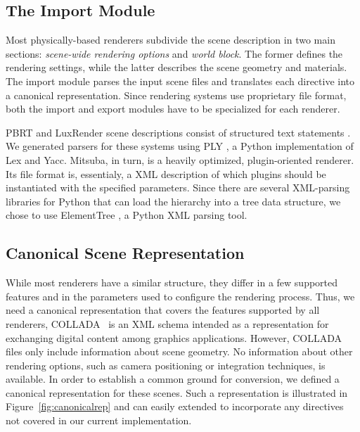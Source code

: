 \subsection{The Import Module}
Most physically-based renderers subdivide the scene description in two main sections:
{\it scene-wide rendering options} and {\it world block}. The former defines the rendering settings, while the latter describes the scene geometry and materials.
%
The import module parses the input scene files and translates each directive into a canonical
representation. Since rendering systems use proprietary file format, both the import and export modules have to be specialized for each renderer.

PBRT and LuxRender scene descriptions consist of structured text statements . We generated parsers for these systems using 
PLY \cite{ply}, a Python implementation of Lex and Yacc.
%
Mitsuba, in turn, is a heavily optimized, plugin-oriented renderer. Its file
format is, essentialy, a XML description of which plugins should be instantiated
with the specified parameters. Since there are several XML-parsing libraries for Python that can load the hierarchy into a tree data
structure, we chose to use ElementTree \cite{ET}, a Python XML parsing tool.

\subsection{Canonical Scene Representation}
While most renderers have a similar structure, they differ in a few supported features and in the parameters used to configure the rendering process. Thus, we need a canonical representation that covers the features supported by all renderers, 
%
 COLLADA~\cite{collada} is an XML schema intended as a representation for exchanging digital content among graphics applications. 
 However, COLLADA files only include information about scene geometry. No information about other rendering 
 options, such as camera positioning or integration techniques, is available. 
 In order to establish a common ground for conversion, we defined a canonical representation for these scenes. Such a representation 
 is illustrated in Figure~\ref{fig:canonicalrep} and can easily extended to incorporate any directives not covered in our current implementation.
 
